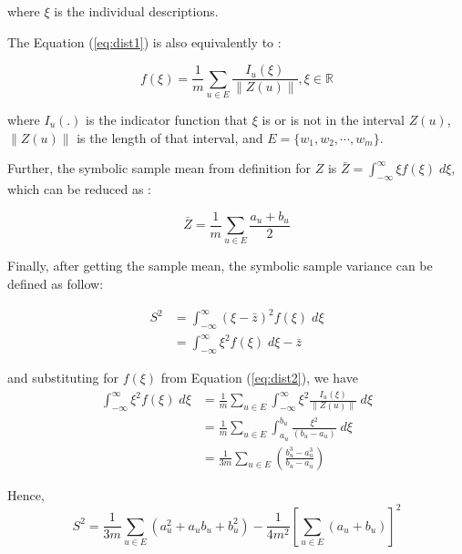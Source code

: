 \documentclass[article]{jss}
\begin{document}
where $\xi$ is the individual descriptions.


The Equation (\ref{eq:dist1}) is also equivalently to :

\begin{equation}\label{eq:dist2}
f(\xi) = \frac{1}{m}\sum_{u \in E}\frac{I_u(\xi)}{\| Z(u) \|},\xi \in \mathbb{R}
\end{equation}

where $I_u(.)$ is the indicator function that $\xi$ is or is not in the interval $Z(u)$, $\| Z(u) \|$ is the length of that interval, and $E=\{w_1,w_2,\cdots,w_m \}$.

Further, the symbolic sample mean from definition for $Z$ is $\bar{Z} = \int_{-\infty}^{\infty} \xi f(\xi)\;d\xi$, which can be reduced as :

\begin{equation}\label{eq:mean}
\bar{Z}=\frac{1}{m}\sum_{u \in E}\frac{a_u+b_u}{2}
\end{equation}

Finally, after getting the sample mean, the symbolic sample variance can be defined as follow:

\begin{equation}\label{eq:varDef}
\begin{split}
S^2 & = \int_{-\infty}^{\infty} (\xi - \bar{z})^2f(\xi)\;d\xi \\
 & = \int_{-\infty}^{\infty} \xi^2f(\xi)\;d\xi-\bar{z}
\end{split}
\end{equation}

and substituting for $f(\xi)$ from Equation (\ref{eq:dist2}), we have 
\begin{equation}\label{eq:derived}
\begin{split}
\int_{-\infty}^{\infty} \xi^2f(\xi)\;d\xi &= \frac{1}{m}\sum_{u \in E}\int_{-\infty}^{\infty} \xi^2 \frac{I_u(\xi)}{\| Z(u) \|}\;d\xi \\
&= \frac{1}{m}\sum_{u \in E} \int_{a_u}^{b_u} \frac{\xi^2}{(b_u-a_u)}\;d\xi \\
&= \frac{1}{3m} \sum_{u \in E}(\frac{b_u^3 - a_u^3}{b_u-a_u})
\end{split}
\end{equation}

Hence,
\begin{equation}\label{eq:var}
S^2 = \frac{1}{3m} \sum_{u \in E}(a_u^2+a_ub_u+b_u^2)-\frac{1}{4m^2}\left[ \sum_{u \in E}(a_u+b_u) \right]^2
\end{equation}
\end{document}
